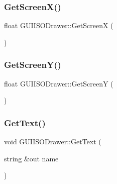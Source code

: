 \hypertarget{class_g_u_i_i_s_o_drawer_adbb34490e2cb0f71270ebb9711154a58}{}\label{class_g_u_i_i_s_o_drawer_adbb34490e2cb0f71270ebb9711154a58} 
\subsubsection{\texorpdfstring{Get\+Screen\+X()}{GetScreenX()}}
{\footnotesize\ttfamily float G\+U\+I\+I\+S\+O\+Drawer\+::\+Get\+ScreenX (\begin{DoxyParamCaption}{ }\end{DoxyParamCaption})}

\hypertarget{class_g_u_i_i_s_o_drawer_aeb8767154af2e5309c50aacca5b5b355}{}\label{class_g_u_i_i_s_o_drawer_aeb8767154af2e5309c50aacca5b5b355} 
\subsubsection{\texorpdfstring{Get\+Screen\+Y()}{GetScreenY()}}
{\footnotesize\ttfamily float G\+U\+I\+I\+S\+O\+Drawer\+::\+Get\+ScreenY (\begin{DoxyParamCaption}{ }\end{DoxyParamCaption})}

\hypertarget{class_g_u_i_i_s_o_drawer_a1dfdb93113aaab6b7966cc710417b1d3}{}\label{class_g_u_i_i_s_o_drawer_a1dfdb93113aaab6b7966cc710417b1d3} 
\subsubsection{\texorpdfstring{Get\+Text()}{GetText()}}
{\footnotesize\ttfamily void G\+U\+I\+I\+S\+O\+Drawer\+::\+Get\+Text (\begin{DoxyParamCaption}\item[{string \&out}]{name }\end{DoxyParamCaption})}

\hypertarget{class_g_u_i_i_s_o_drawer_a8e16dd81833b7db5e6b07980a8fafee3}{}\label{class_g_u_i_i_s_o_drawer_a8e16dd81833b7db5e6b07980a8fafee3} 
